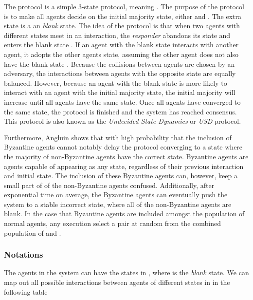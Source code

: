 The protocol is a simple 3-state protocol, meaning . The purpose of the protocol is to make all agents decide on the initial majority state, either  and . The extra state  is a an \emph{blank} state. The idea of the protocol is that when two agents with different states meet in an interaction, the \emph{responder} abandons its state and enters the blank state . If an agent with the blank state  interacts with another agent, it adopts the other agents state, assuming the other agent does not also have the blank state . Because the collisions between agents are chosen by an adversary, the interactions between agents with the opposite state are equally balanced. However, because an agent with the blank state is more likely to interact with an agent with the initial majority state, the initial majority will increase until all agents have the same state. Once all agents have converged to the same state, the protocol is finished and the system has reached consensus. This protocol is also known as the \emph{Undecided State Dynamics} or \emph{USD} protocol.

Furthermore, Angluin shows that with high probability that the inclusion of  Byzantine agents cannot notably delay the protocol converging to a state where the majority of non-Byzantine agents have the correct state. Byzantine agents are agents capable of appearing as any state, regardless of their previous interaction and initial state. The inclusion of these Byzantine agents can, however, keep a small part of of the non-Byzantine agents confused. Additionally, after exponential time on average, the Byzantine agents can eventually push the system to a stable incorrect state, where all of the non-Byzantine agents are blank. In the case that  Byzantine agents are included amongst the population  of normal agents, any execution select a pair at random from the combined population of  and .

\subsubsection{Notations} \label{notations_angluin_usd}

The agents in the system can have the states in , where  is the \emph{blank} state. We can map out all possible interactions between agents of different states in  in the following table


